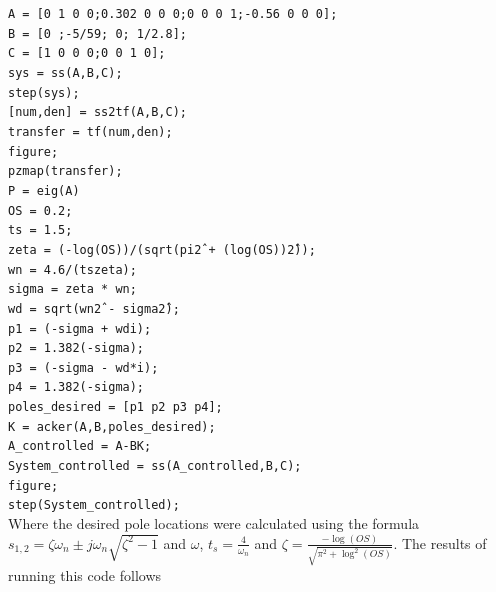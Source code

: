 \documentclass[a4paper, 12pt]{article}
\begin{document}
\noindent
	\texttt{A = [0 1 0 0;0.302 0 0 0;0 0 0 1;-0.56 0 0 0];}\\
	\texttt{B = [0 ;-5/59; 0; 1/2.8];}\\
	\texttt{C = [1 0 0 0;0 0 1 0];}\\
	\texttt{sys = ss(A,B,C);}\\
	\texttt{step(sys);}\\
	\texttt{[num,den] = ss2tf(A,B,C);}\\
	\texttt{transfer = tf(num,den);}\\
	\texttt{figure;}\\
	\texttt{pzmap(transfer);}\\
	\texttt{P = eig(A)}\\
	\texttt{OS = 0.2;}\\
	\texttt{ts = 1.5;}\\
	\texttt{zeta = (-log(OS))/(sqrt(pi\^2 + (log(OS))\^2));}\\
	\texttt{wn = 4.6/(ts\*zeta);}\\
	\texttt{sigma = zeta * wn;}\\
	\texttt{wd = sqrt(wn\^2 - sigma\^2);}\\
	\texttt{p1 = (-sigma + wd\*i);}\\
	\texttt{p2 = 1.382\*(-sigma);}\\
	\texttt{p3 = (-sigma - wd*i);}\\
	\texttt{p4 = 1.382\*(-sigma);}\\
	\texttt{poles\_desired = [p1 p2 p3 p4];}\\
	\texttt{K = acker(A,B,poles\_desired);}\\
	\texttt{A\_controlled = A-B\*K;}\\
	\texttt{System\_controlled = ss(A\_controlled,B,C);}\\
	\texttt{figure;}\\
	\texttt{step(System\_controlled);}\\

\newpage
Where the desired pole locations were calculated using the formula $s_{1,2}
=\zeta \omega_n \pm j\omega_n\sqrt{\zeta^2-1}$ and $\omega$, $t_s =
\frac{4}{\omega_n}$ and $\zeta = \frac{-\log(OS)}{\sqrt{\pi^2+\log^2(OS)}}$.
The results of running this code follows 
\end{document}
